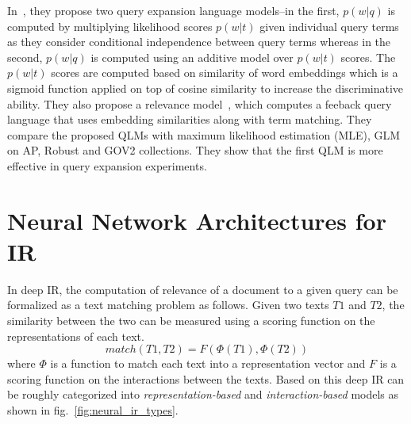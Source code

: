 In~\cite{Zamani_16a}, they propose two query expansion language models--in the first, $p(w|q)$ is computed by multiplying likelihood scores $p(w|t)$ given individual query terms as they consider conditional independence between query terms whereas in the second, $p(w|q)$ is computed using an additive model over $p(w|t)$ scores. The $p(w|t)$ scores are computed based on similarity of word embeddings which is a sigmoid function applied on top of cosine similarity to increase the discriminative ability. They also propose a relevance model~\citep{Lavrenko_2001}, which computes a feeback query language that uses embedding similarities along with term matching. They compare the proposed QLMs with maximum likelihood estimation (MLE), GLM~\citep{Ganguly_GLM15} on AP, Robust and GOV2 collections. They show that the first QLM is more effective in query expansion experiments. 


\section{Neural Network Architectures for IR}
\label{sec:nn_for_ir}

In deep IR, the computation of relevance of a document to a given query can be formalized as a text matching problem as follows. Given two texts $T1$ and $T2$, the similarity between the two can be measured using a scoring function on the representations of each text.
\begin{equation}
    match(T1, T2) = F(\Phi(T1),\Phi(T2)) 
\end{equation}
where $\Phi$ is a function to match each text into a representation vector and $F$ is a scoring function on the interactions between the texts. Based on this deep IR can be roughly categorized into \textit{representation-based} and \textit{interaction-based} models as shown in fig.~\ref{fig:neural_ir_types}.

